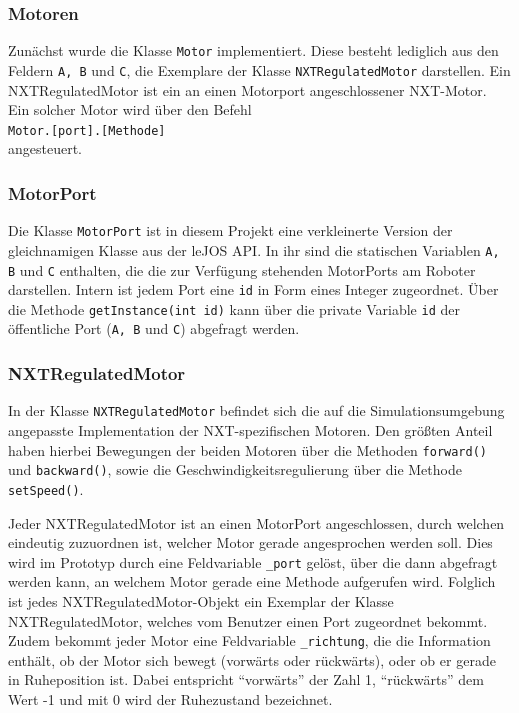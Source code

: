 \documentclass[paper=a4, DIV=calc, BCOR=15mm, twoside=on, onecolumn=on, open = right, titlepage =on, parskip =half, headsepline = on, footsepline = on, chapterprefix = off, appendixprefix = off, fontsize = 12pt, numbers = noenddot, abstract = on]{scrbook}
\begin{document}
\subsubsection{Motoren}
Zunächst wurde die Klasse \texttt{Motor} implementiert. Diese besteht lediglich aus den Feldern \texttt{A, B} und \texttt{C}, die Exemplare der Klasse \texttt{NXTRegulatedMotor} darstellen. Ein NXTRegulatedMotor ist ein an einen Motorport angeschlossener NXT-Motor. Ein solcher Motor wird über den Befehl\\
\hspace*{2em} \texttt{Motor.[port].[Methode]}\\
angesteuert. 

\subsubsection{MotorPort}
Die Klasse \texttt{MotorPort} ist in diesem Projekt eine verkleinerte Version der gleichnamigen Klasse aus der leJOS API. In ihr sind die statischen Variablen \texttt{A, B} und \texttt{C} enthalten, die die zur Verfügung stehenden MotorPorts am Roboter darstellen. Intern ist jedem Port eine \texttt{id} in Form eines Integer zugeordnet. Über die Methode \texttt{get\-In\-stance(int id)} kann über die private Variable \texttt{id} der öffentliche Port (\texttt{A, B} und \texttt{C}) abgefragt werden.

\subsubsection{NXTRegulatedMotor}
In der Klasse \texttt{NXTRegulatedMotor} befindet sich die auf die Simulationsumgebung angepasste Implementation der NXT-spezifischen Motoren. Den größten Anteil haben hierbei Bewegungen der beiden Motoren über die Methoden \texttt{for\-ward()} und \texttt{back\-ward()}, sowie die Geschwindigkeitsregulierung über die Methode \texttt{set\-Speed()}. 

Jeder NXTRegulatedMotor ist an einen MotorPort angeschlossen, durch welchen eindeutig zuzuordnen ist, welcher Motor gerade angesprochen werden soll. Dies wird im Prototyp durch eine Feldvariable \texttt{{\_}port} gelöst, über die dann abgefragt werden kann, an welchem Motor gerade eine Methode aufgerufen wird. Folglich ist jedes NXT\-Regulated\-Motor\--Objekt ein Exemplar der Klasse NXTRegulatedMotor, welches vom Benutzer einen Port zugeordnet bekommt.\\
Zudem bekommt jeder Motor eine Feldvariable \texttt{{\_}richtung}, die die Information enthält, ob der Motor sich bewegt (vorwärts oder rückwärts), oder ob er gerade in Ruheposition ist. Dabei entspricht "`vorwärts"' der Zahl 1, "`rückwärts"' dem Wert -1 und mit 0 wird der Ruhezustand bezeichnet.
\end{document}

